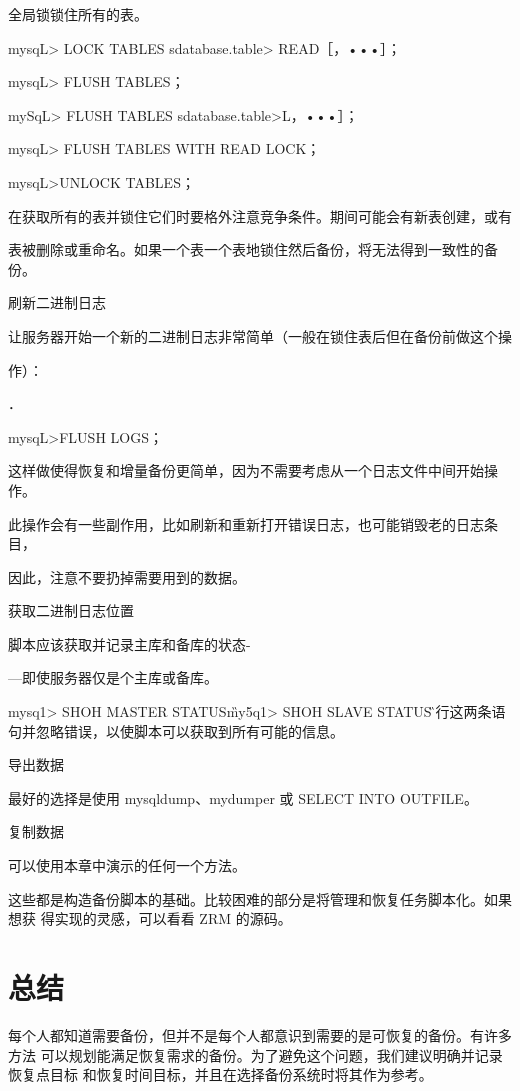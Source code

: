 全局锁锁住所有的表。

mysqL> LOCK TABLES sdatabase.table> READ［，•••］；

mysqL> FLUSH TABLES；

mySqL> FLUSH TABLES sdatabase.table>L，•••］；

mysqL> FLUSH TABLES WITH READ LOCK；

mysqL>UNLOCK TABLES；

在获取所有的表并锁住它们时要格外注意竞争条件。期间可能会有新表创建，或有

表被删除或重命名。如果一个表一个表地锁住然后备份，将无法得到一致性的备份。

刷新二进制日志

让服务器开始一个新的二进制日志非常简单（一般在锁住表后但在备份前做这个操

作）：

．

mysqL>FLUSH LOGS；

这样做使得恢复和增量备份更简单，因为不需要考虑从一个日志文件中间开始操作。

此操作会有一些副作用，比如刷新和重新打开错误日志，也可能销毁老的日志条目，

因此，注意不要扔掉需要用到的数据。

获取二进制日志位置

脚本应该获取并记录主库和备库的状态-

—即使服务器仅是个主库或备库。

mysq1> SHOH MASTER STATUS\G

my5q1> SHOH SLAVE STATUS\G

执行这两条语句并忽略错误，以使脚本可以获取到所有可能的信息。

导出数据

最好的选择是使用 mysqldump、mydumper 或 SELECT INTO OUTFILE。

复制数据

可以使用本章中演示的任何一个方法。

这些都是构造备份脚本的基础。比较困难的部分是将管理和恢复任务脚本化。如果想获
得实现的灵感，可以看看 ZRM 的源码。

\section{总结}
每个人都知道需要备份，但并不是每个人都意识到需要的是可恢复的备份。有许多方法
可以规划能满足恢复需求的备份。为了避免这个问题，我们建议明确并记录恢复点目标
和恢复时间目标，并且在选择备份系统时将其作为参考。

